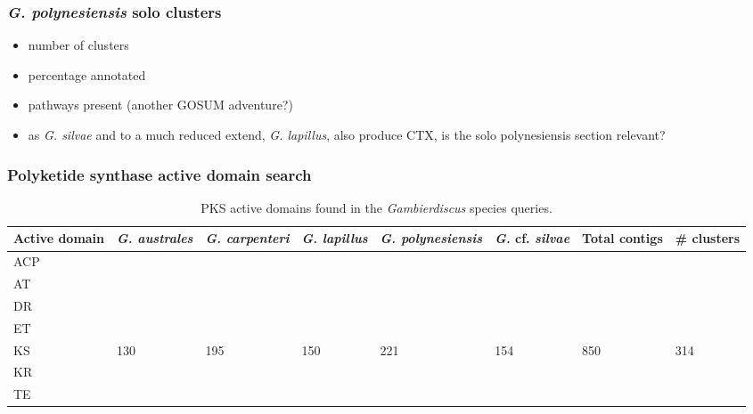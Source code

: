 \documentclass[12pt]{article}
\begin{document}
\subsubsection{\textit{G. polynesiensis} solo clusters}
\begin{itemize}
\item number of clusters
\item percentage annotated
\item pathways present (another GOSUM adventure?)
\item as \textit{G. silvae} and to a much reduced extend, \textit{G. lapillus}, also produce CTX, is the solo polynesiensis section relevant?
\end{itemize}


\subsubsection{Polyketide synthase active domain search}

\begin{table}
\caption{PKS active domains found in the \emph{Gambierdiscus} species queries.}
\label{tbl:PKSTable}
\begin{tabular}{ | p{1.65cm} | p{1.5cm} | p{1.5cm} | p{1.5cm} | p{1.7cm} | p{1.5cm}| p{1.5cm}| p{1.5cm}|}
\hline
\textbf{Active domain}& \textit{G. australes}& \emph{G. carpenteri}&\emph{G. lapillus}&\emph{G. polynesiensis}&\emph{G.} cf. \emph{silvae}&\textbf{Total contigs}&\textbf{\# clusters}\\
\hline
ACP&&&&&&&\\
\hline
AT&&&&&&&\\
\hline
DR&&&&&&&\\
\hline
ET&&&&&&&\\
\hline
KS&130&195&150&221&154&850&314\\
\hline
KR&&&&&&&\\
\hline
TE&&&&&&&\\
\hline
\end{tabular}
\end{table}
\FloatBarrier
\end{document}
